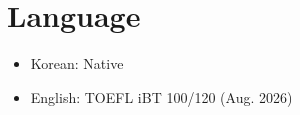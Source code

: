 \section{Language}
\begin{itemize}
  \item Korean: Native
  \item English: TOEFL iBT 100/120 (Aug. 2026)
\end{itemize}
